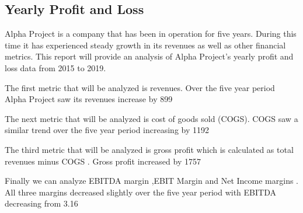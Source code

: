 

\subsection{Yearly Profit and Loss}\label{sec:title}

Alpha Project is a company that has been in operation for five years. During this time it has experienced steady growth in its revenues as well as other financial metrics. This report will provide an analysis of Alpha Project's yearly profit and loss data from 2015 to 2019. 

The first metric that will be analyzed is revenues. Over the five year period Alpha Project saw its revenues increase by 899%

The next metric that will be analyzed is cost of goods sold (COGS). COGS saw a similar trend over the five year period increasing by 1192%

The third metric that will be analyzed is gross profit which is calculated as total revenues minus COGS . Gross profit increased by 1757%

 Finally we can analyze EBITDA margin ,EBIT Margin and Net Income margins . All three margins decreased slightly over the five year period with EBITDA decreasing from 3.16 %
